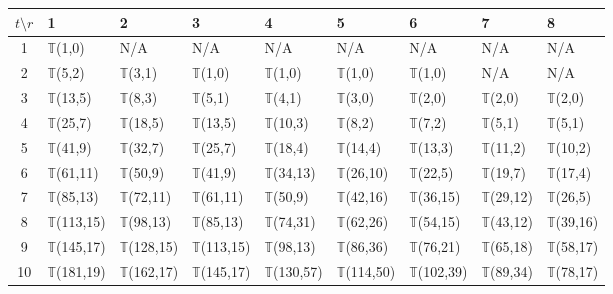 \documentclass[12pt]{amsart}
\newcounter{y}
\newcounter{y2}
\newcommand{\T}{
    \mathbb{T}
}
\begin{document}
\renewcommand{\arraystretch}{1.5}
{\setlength\tabcolsep{4pt} %
\begin{footnotesize}
 \begin{centering}
 \begin{longtable}
 {||c | l  l  l  l  l  l  l  l||} 
 \hline
 $t \setminus r$ & 1 & 2 & 3 & 4 & 5 & 6 & 7 & 8 \\%
 \hline\hline
 1 & $\T$(1,0) & N/A             & N/A         & N/A          & N/A         & N/A         & N/A         & N/A\\%
 \hline
 2 & $\T$(5,2) & $\T$(3,1)       & $\T$(1,0)   & $\T$(1,0)    & $\T$(1,0)   & $\T$(1,0)   & N/A         & N/A         \\%
 \hline
 3 & $\T$(13,5) & $\T$(8,3)      & $\T$(5,1)   & $\T$(4,1)    & $\T$(3,0)   & $\T$(2,0)   & $\T$(2,0)   & $\T$(2,0)   \\%
 \hline
 4 & $\T$(25,7) & $\T$(18,5)     & $\T$(13,5)  & $\T$(10,3)   & $\T$(8,2)   & $\T$(7,2)   & $\T$(5,1)   & $\T$(5,1)   \\%
 \hline
 5 & $\T$(41,9) & $\T$(32,7)     & $\T$(25,7)  & $\T$(18,4)   & $\T$(14,4)  & $\T$(13,3)  & $\T$(11,2)  & $\T$(10,2)  \\%
 \hline
 6 & $\T$(61,11) & $\T$(50,9)    & $\T$(41,9)  & $\T$(34,13)  & $\T$(26,10) & $\T$(22,5)  & $\T$(19,7)  & $\T$(17,4)  \\%
  \hline 
 7 & $\T$(85,13) & $\T$(72,11)   & $\T$(61,11) & $\T$(50,9)   & $\T$(42,16) & $\T$(36,15) & $\T$(29,12) & $\T$(26,5)  \\%
 \hline
 8 & $\T$(113,15) & $\T$(98,13)  & $\T$(85,13) & $\T$(74,31)  & $\T$(62,26) & $\T$(54,15) & $\T$(43,12) & $\T$(39,16) \\%
 \hline
 9 & $\T$(145,17) & $\T$(128,15) & $\T$(113,15)& $\T$(98,13)  & $\T$(86,36) & $\T$(76,21) & $\T$(65,18) & $\T$(58,17) \\%
  \hline
 10 & $\T$(181,19)& $\T$(162,17) & $\T$(145,17)& $\T$(130,57) & $\T$(114,50)&$\T$(102,39)& $\T$(89,34) & $\T$(78,17) \\%

\end{longtable}
\end{centering}
\end{footnotesize}}
\end{document}
